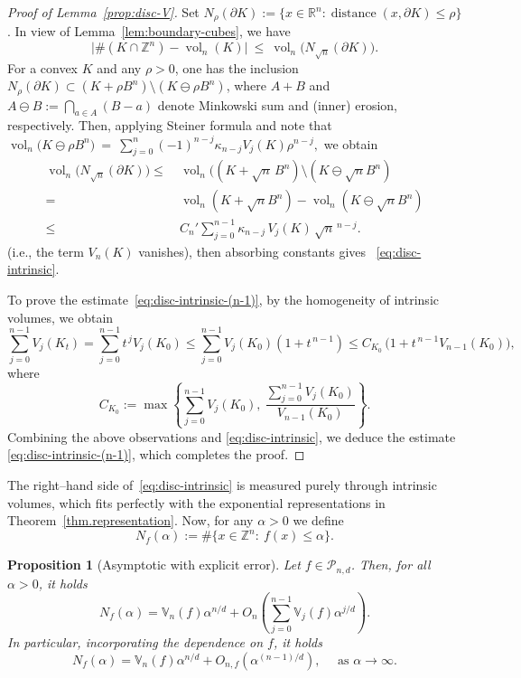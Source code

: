 \documentclass[11pt]{article}
\newtheorem{proposition}[theorem]{Proposition}
\theoremstyle{definition}
\numberwithin{equation}{section}
\newcommand{\R}{\mathbb{R}}
\newcommand{\Z}{\mathbb{Z}}
\newcommand{\cP}{\mathcal{P}}        %
\newcommand{\opV}{\mathds{V}}       %
\DeclareMathOperator{\vol}{vol}
\begin{document}
\begin{proof}[Proof of Lemma~\ref{prop:disc-V}]
Set $N_\rho(\partial K):=\{x \in \R^n:\operatorname{distance}(x,\partial K)\le\rho\}$.
In view of Lemma~\ref{lem:boundary-cubes}, we have
\[
  \big|\#(K\cap\Z^n)-\vol_n(K)\big|\ \le\ \vol_n\big(N_{\sqrt n}(\partial K)\big).
\]
For a convex $K$ and any $\rho>0$, one has the inclusion
$N_\rho(\partial K)\subset (K + \rho B^n)\setminus (K\ominus \rho B^n)$,
where $A + B$ and $A\ominus B := \bigcap_{a \in A} (B - a)$ denote Minkowski sum and (inner) erosion, respectively.
Then, applying Steiner formula and note that $\vol_n\big(K\ominus \rho B^n\big)
\ =\ \sum_{j=0}^{n}(-1)^{n-j}\kappa_{n-j}V_j(K)\rho^{n-j},$ we obtain
\begin{align*}
  \vol_n\big(N_{\sqrt n}(\partial K)\big)
 \leq & ~ \vol_n((K + \sqrt n\,B^n) \setminus (K \ominus \sqrt{n}B^n) \\
 = & ~ \vol_n(K + \sqrt{n}B^n) - \vol_n(K \ominus \sqrt{n}B^n) \\
 \leq & ~ C_n'\sum_{j=0}^{n-1}\kappa_{n-j}\,V_j(K)\,\sqrt{n}^{\,n-j}.
\end{align*}
(i.e., the term $V_n(K)$ vanishes), then absorbing constants gives ~\eqref{eq:disc-intrinsic}.

\medskip

To prove the estimate~\eqref{eq:disc-intrinsic-(n-1)}, by the homogeneity of intrinsic volumes, we obtain
\[
    \sum_{j=0}^{n-1}V_j(K_t)=\sum_{j=0}^{n-1}t^{\,j}V_j(K_0)
    \leq \sum_{j=0}^{n-1}V_j(K_0)(1+t^{\,n-1})
    \leq  C_{K_0}\,\bigl(1+t^{\,n-1}V_{n-1}(K_0)\bigr),
\]
where 
\[
C_{K_0} := \max \left\{\sum_{j=0}^{n-1}V_j(K_0),\ \frac{\sum_{j=0}^{n-1}V_j(K_0)}{V_{n-1}(K_0)} \right\}.
\]
Combining the above observations and \eqref{eq:disc-intrinsic}, we deduce the estimate \eqref{eq:disc-intrinsic-(n-1)}, which completes the proof.
\end{proof}

The right–hand side of~\eqref{eq:disc-intrinsic} is measured purely through intrinsic volumes, which fits perfectly with the exponential representations in Theorem~\ref{thm.representation}.
Now, for any $\alpha>0$ we define
\[
  N_f(\alpha):=\#\{x\in\Z^n:\ f(x)\le \alpha\}.
\]

\begin{proposition}[Asymptotic with explicit error]\label{thm:lattice-asymp}
Let $f \in \cP_{n, d}$.
Then, for all $\alpha > 0$, it holds
\begin{equation}\label{eq:Nf-asymp-lowe-term}
  N_f(\alpha) = \opV_n(f) \alpha^{n/d} + 
  O_n \left(  \sum_{j=0}^{n-1} \opV_j(f) \alpha^{j/d}  \right).
\end{equation}
In particular, incorporating the dependence on $f$, it holds
\begin{equation}\label{eq:Nf-asymp-higher-term}
    N_f(\alpha) = \opV_n(f) \alpha^{n/d} + O_{n, f}(\alpha^{(n - 1)/d}), \quad \text{ as } \alpha \to \infty.
\end{equation}
\end{proposition}
\end{document}
